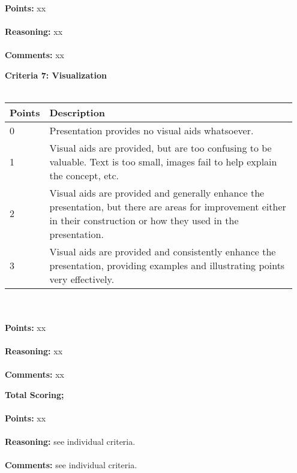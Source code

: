 \documentclass{article}
\begin{document}
\hspace{1cm} \\
\textbf{\large Points: } xx \\

\hspace{1cm} \\
\textbf{\large Reasoning: } xx \\

\hspace{1cm} \\
\textbf{\large Comments: } xx \\

\pagebreak


\textbf{\large Criteria 7: Visualization} \\
\hspace{1cm} \\
\begin{tabular}{|p{0.075\linewidth}||p{0.875\linewidth}|}
    \hline
    \textbf{Points} & \textbf{Description} \\
    \hline
    \hline
    0      & Presentation provides no visual aids whatsoever. \\
    \hline
    1      & Visual aids are provided, but are too confusing to be valuable. Text is too small, images fail to help explain the concept, etc. \\
    \hline
    2      & Visual aids are provided and generally enhance the presentation, but there are areas for improvement either in their construction or how they used in the presentation. \\
    \hline
    3      & Visual aids are provided and consistently enhance the presentation, providing examples and illustrating points very effectively. \\
    \hline
\end{tabular} \\

\hspace{1cm} \\
\textbf{\large Points: } xx \\

\hspace{1cm} \\
\textbf{\large Reasoning: } xx \\

\hspace{1cm} \\
\textbf{\large Comments: } xx \\

\pagebreak


\textbf{\large Total Scoring;} \\

\hspace{1cm} \\
\textbf{\large Points: } xx \\

\hspace{1cm} \\
\textbf{\large Reasoning: } see individual criteria. \\

\hspace{1cm} \\
\textbf{\large Comments: } see individual criteria. \\

\pagebreak
\end{document}
